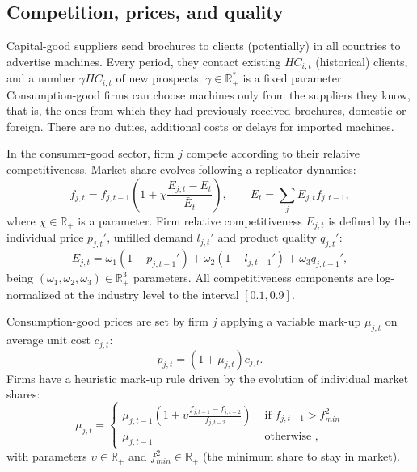 \documentclass[a4paper,11pt]{article}
\begin{document}
\begin{appendices}
\subsection*{Competition, prices, and quality}

Capital-good suppliers send brochures to clients (potentially) in all countries to advertise machines. Every period, they contact existing ${HC}_{i,t}$ (historical) clients, and a number $\gamma {HC}_{i,t}$ of new prospects. $\gamma \in \mathbb{R}_+^*$ is a fixed parameter. Consumption-good firms can choose machines only from the suppliers they know, that is, the ones from which they had previously received brochures, domestic or foreign. There are no duties, additional costs or delays for imported machines.

In the consumer-good sector, firm $j$ compete according to their relative competitiveness. Market share evolves following a replicator dynamics:
\begin{equation}
	f_{j,t} = f_{j,t-1} \left( 1 + \chi \frac{ E_{j,t} - \bar{E}_t }{ \bar{E}_t } \right), \qquad \bar{E}_t = \sum_{j} E_{j,t} f_{j,t-1},
\end{equation}
where $\chi \in \mathbb{R}_+$ is a parameter. Firm relative competitiveness $E_{j,t}$ is defined by the individual price $p_{j,t}'$, unfilled demand $l_{j,t}'$ and product quality $q_{j,t}'$:
\begin{equation}
	E_{j,t} = \omega_1 \left( 1 - p_{j,t-1}' \right) + \omega_2 \left( 1 - l_{j,t-1}' \right) + \omega_3 q_{j,t-1}',
	\label{competitiveness}
\end{equation}
being $(\omega_1, \omega_2, \omega_3) \in \mathbb{R}^3_+$ parameters. All competitiveness components are log-normalized at the industry level to the interval $[0.1,0.9]$.

Consumption-good prices are set by firm $j$ applying a variable mark-up $\mu_{j,t}$ on average unit cost $c_{j,t}$:
\begin{equation}
	p_{j,t} = \left( 1 + \mu_{j,t} \right) c_{j,t}.
\end{equation}
Firms have a heuristic mark-up rule driven by the evolution of individual market shares:
\begin{equation}
	\mu_{j,t} =
	\begin{cases}
		\mu_{j,t-1} \left( 1 + \upsilon \frac{ f_{j,t-1} - f_{j,t-2} }{ f_{j,t-2} } \right) & \mbox{ if } f_{j,t-1} > f_{min}^2 \\
		\mu_{j,t-1} & \mbox{ otherwise },
	\end{cases}
\end{equation}
with parameters $\upsilon \in \mathbb{R}_+$ and $f_{min}^2 \in \mathbb{R}_+$ (the minimum share to stay in market).


\end{appendices}
\end{document}
